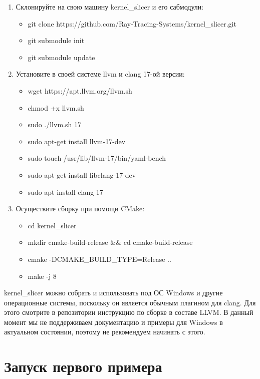 \documentclass[11pt,fleqn,english,russian]{report} %
\begin{document}
\begin{enumerate}
	
\item Склонируйте на свою машину kernel\_slicer и его сабмодули: \begin{itemize}
	\item git clone https://github.com/Ray-Tracing-Systems/kernel\_slicer.git
	\item git submodule init
	\item git submodule update
\end{itemize}

\item Установите в своей системе llvm и clang 17-ой версии: \begin{itemize}
	\item wget https://apt.llvm.org/llvm.sh
	\item chmod +x llvm.sh
	\item sudo ./llvm.sh 17
	\item sudo apt-get install llvm-17-dev
	\item sudo touch /usr/lib/llvm-17/bin/yaml-bench
	\item sudo apt-get install libclang-17-dev
	\item sudo apt install clang-17
\end{itemize}

\item Осуществите сборку при помощи CMake: 
\begin{itemize}
	\item cd kernel\_slicer
    \item mkdir cmake-build-release \&\& cd cmake-build-release
    \item cmake -DCMAKE\_BUILD\_TYPE=Release .. 
    \item make -j 8
\end{itemize}

\end{enumerate}

\begin{remark}
	kernel\_slicer можно собрать и использовать под ОС Windows и другие операционные системы, поскольку он является обычным плагином для clang. Для этого смотрите в репозитории инструкцию по сборке в составе LLVM. В данный момент мы не поддерживаем документацию и примеры для Windows в актуальном состоянии, поэтому не рекомендуем начинать с этого. 
\end{remark}

\pagebreak
\section{Запуск первого примера}
\end{document}
